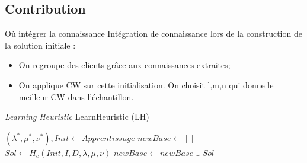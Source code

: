 \documentclass{beamer}
\begin{document}
\subsection{Contribution}

\begin{frame}{Où intégrer la connaissance}
Intégration de connaissance lors de la construction de la solution initiale :
\begin{itemize}
\item On regroupe des clients grâce aux connaissances extraites;
\item On applique CW sur cette initialisation. On choisit l,m,n qui donne le meilleur CW dans l'échantillon.
\end{itemize}
\end{frame}

\begin{frame}{\emph{Learning Heuristic}}
LearnHeuristic (LH)

\begin{algorithm}[H]
\DontPrintSemicolon %
$(\lambda^*,\mu^*,\nu^*), Init \gets Apprentissage$\;
$newBase \gets []$\;
 {
	 {
		$Sol \gets H_c(Init,I,D,\lambda,\mu,\nu)$\;
		$newBase \gets newBase \cup Sol$\;
	}
}
\;
\end{algorithm}
\end{frame}
\end{document}
